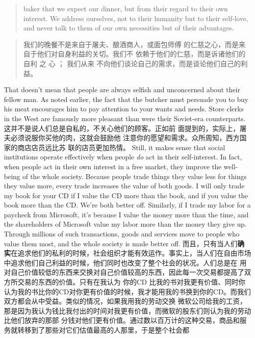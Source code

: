 \begin{paracol}{2}
\begin{quote}
baker that we expect our dinner, but from their regard to their own interest. We address ourselves, not to their humanity but to
their self-love, and never talk to them of our own necessities but
of their advantages.
\end{quote}
\switchcolumn
\begin{quote}
	我们的晚餐不是来自于屠夫、酿酒商人，或面包师傅
	的仁慈之心，而是来自于他们对自身利益的关切。我们不
	依赖于他们的仁慈，而是诉诸他们的自利 之 心 ； 我们从来
	不向他们谈论自己的需求，而是谈论他们自己的利益。
\end{quote}
\switchcolumn*
That doesn't mean that people are always selfish and unconcerned about their fellow man. As noted earlier, the fact that
the butcher must persuade you to buy his meat encourages him
to pay attention to your wants and needs. Store clerks in the
West are famously more pleasant than were their Soviet-era
counterparts.
\switchcolumn
这并不是说人们总是自私的，不关心他们的顾客。正如前
面提到的，实际上，屠夫必须说服你买他的肉，这就会鼓励他
注意你的愿望和需求。众所周知，西方国家的商店店员远比苏
联的店员更加热情。
\switchcolumn*
Still, it makes sense that social institutions operate effectively
when people \textit{do} act in their self-interest. In fact, when people
act in their own interest in a free market, they improve the
well-being of the whole society. Because people trade things
they value less for things they value more, every trade increases
the value of both goods. I will only trade my book for your CD
if I value the CD more than the book, and if you value the book
more than the CD. We're both better off. Similarly, if I trade my
labor for a paycheck from Microsoft, it's because I value the
money more than the time, and the shareholders of Microsoft
value my labor more than the money they give up. Through
millions of such transactions, goods and services move to people
who value them most, and the whole society is made better off.
\switchcolumn
而且，只有当人们\textbf{确实}在追求他们的私利的时候，社会组织才能有效运作。事实上，当人们在自由市场中追求他们自己利益的时候，他们同时也改变了整个社会的状况。人们总是在
用对自己价值较低的东西来交换对自己价值较高的东西，因此每一次交易都提高了双方所交易的东西的价值。只有在我认为
你的CD 比我的书对我更有价值、同时你认为我的书比你的CD对你更有价值的时候，我才能用我的书换到你的CD。而我们双方都会从中受益。类似的情况，如果我用我的劳动交换
微软公司给我的工资，那是因为我认为钱比我付出的时间对我更有价值，而微软的股东们则认为我的劳动比他们放弃的那部
分钱对他们更有价值。通过数以百万计的这种交易，商品和服
务就转移到了那些对它们估值最高的人那里，于是整个社会都

\end{paracol}
